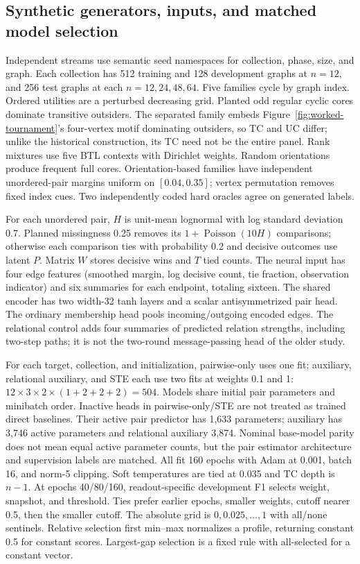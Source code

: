 \subsection{Synthetic generators, inputs, and matched model selection}
Independent streams use semantic seed namespaces for collection, phase, size, and graph. Each collection has 512 training and 128 development graphs at $n=12$, and 256 test graphs at each $n=12,24,48,64$. Five families cycle by graph index. Ordered utilities are a perturbed decreasing grid. Planted odd regular cyclic cores dominate transitive outsiders. The separated family embeds Figure~\ref{fig:worked-tournament}'s four-vertex motif dominating outsiders, so TC and UC differ; unlike the historical construction, its TC need not be the entire panel. Rank mixtures use five BTL contexts with Dirichlet weights. Random orientations produce frequent full cores. Orientation-based families have independent unordered-pair margins uniform on $[0.04,0.35]$; vertex permutation removes fixed index cues. Two independently coded hard oracles agree on generated labels.

For each unordered pair, $H$ is unit-mean lognormal with log standard deviation 0.7. Planned missingness 0.25 removes its $1+\operatorname{Poisson}(10H)$ comparisons; otherwise each comparison ties with probability 0.2 and decisive outcomes use latent $P$. Matrix $W$ stores decisive wins and $T$ tied counts. The neural input has four edge features (smoothed margin, log decisive count, tie fraction, observation indicator) and six summaries for each endpoint, totaling sixteen. The shared encoder has two width-32 tanh layers and a scalar antisymmetrized pair head. The ordinary membership head pools incoming/outgoing encoded edges. The relational control adds four summaries of predicted relation strengths, including two-step paths; it is not the two-round message-passing head of the older study.

For each target, collection, and initialization, pairwise-only uses one fit; auxiliary, relational auxiliary, and STE each use two fits at weights 0.1 and 1: $12\times3\times2\times(1+2+2+2)=504$. Models share initial pair parameters and minibatch order. Inactive heads in pairwise-only/STE are not treated as trained direct baselines. Their active pair predictor has 1,633 parameters; auxiliary has 3,746 active parameters and relational auxiliary 3,874. Nominal base-model parity does not mean equal active parameter counts, but the pair estimator architecture and supervision labels are matched. All fit 160 epochs with Adam at 0.001, batch 16, and norm-5 clipping. Soft temperatures are tied at 0.035 and TC depth is $n-1$. At epochs 40/80/160, readout-specific development F1 selects weight, snapshot, and threshold. Ties prefer earlier epochs, smaller weights, cutoff nearer 0.5, then the smaller cutoff. The absolute grid is $0,0.025,\ldots,1$ with all/none sentinels. Relative selection first min--max normalizes a profile, returning constant 0.5 for constant scores. Largest-gap selection is a fixed rule with all-selected for a constant vector.

